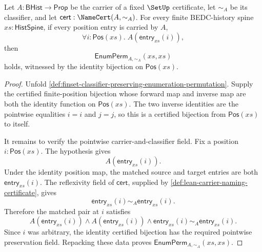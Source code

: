 \begin{theorem}
\label{thm:enumperm-identity-reflexivity}
Let $A:\mathsf{BHist}\to\mathsf{Prop}$ be the carrier of a fixed $\SetUp$ certificate, let $\sim_A$ be its classifier, and let $\mathsf{cert}:\NameCert(A,\sim_A)$. For every finite BEDC-history spine $xs:\mathsf{HistSpine}$, if every position entry is carried by $A$,
$$
\forall i:\mathsf{Pos}(xs).\;A(\mathsf{entry}_{xs}(i)),
$$
then
$$
\mathsf{EnumPerm}_{A,\sim_A}(xs,xs)
$$
holds, witnessed by the identity bijection on $\mathsf{Pos}(xs)$.
\end{theorem}
\begin{proof}
Unfold \autoref{def:finset-classifier-preserving-enumeration-permutation}. Supply the certified finite-position bijection whose forward map and inverse map are both the identity function on $\mathsf{Pos}(xs)$. The two inverse identities are the pointwise equalities $i=i$ and $j=j$, so this is a certified bijection from $\mathsf{Pos}(xs)$ to itself.

It remains to verify the pointwise carrier-and-classifier field. Fix a position $i:\mathsf{Pos}(xs)$. The hypothesis gives
$$
A(\mathsf{entry}_{xs}(i)).
$$
Under the identity position map, the matched source and target entries are both $\mathsf{entry}_{xs}(i)$. The reflexivity field of $\mathsf{cert}$, supplied by \autoref{def:lean-carrier-naming-certificate}, gives
$$
\mathsf{entry}_{xs}(i)\sim_A\mathsf{entry}_{xs}(i).
$$
Therefore the matched pair at $i$ satisfies
$$
A(\mathsf{entry}_{xs}(i))\land
A(\mathsf{entry}_{xs}(i))\land
\mathsf{entry}_{xs}(i)\sim_A\mathsf{entry}_{xs}(i).
$$
Since $i$ was arbitrary, the identity certified bijection has the required pointwise preservation field. Repacking these data proves $\mathsf{EnumPerm}_{A,\sim_A}(xs,xs)$.
\end{proof}

